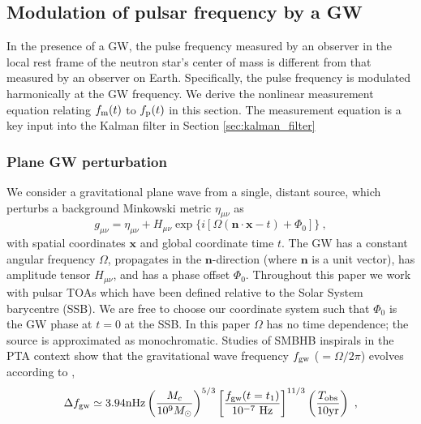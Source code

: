 \documentclass[fleqn,usenatbib,useAMS]{mnras}
\begin{document}
\subsection{Modulation of pulsar frequency by a GW} \label{sec:psr_measured}
In the presence of a GW, the pulse frequency measured by an observer in the local rest frame of the neutron star's center of mass is different from that measured by an observer on Earth. Specifically, the pulse frequency is modulated harmonically at the GW frequency. We derive the nonlinear measurement equation relating $f_{\rm m}(t)$ to $f_{\rm p}(t)$ in this section. The measurement equation is a key input into the Kalman filter in Section \eqref{sec:kalman_filter}
\subsubsection{Plane GW perturbation}\label{sec:plane_gw}
We consider a gravitational plane wave from a single, distant source, which perturbs a background Minkowski metric $\eta_{\mu \nu}$ as
\begin{equation}
	g_{\mu \nu} = \eta_{\mu \nu} + H_{\mu \nu} \exp{ \{ i[\Omega(\boldsymbol{n} \cdot \boldsymbol{x} - t) + \Phi_0] \} } \ ,
\end{equation}
with spatial coordinates $\boldsymbol{x}$ and global coordinate time $t$. The GW has a constant angular frequency $\Omega$, propagates in the $\boldsymbol{n}$-direction (where $\boldsymbol{n}$ is a unit vector), has amplitude tensor $H_{\mu \nu}$, and has a phase offset  $\Phi_0$. Throughout this paper we work with pulsar TOAs which have been defined relative to the Solar System barycentre (SSB). We are free to choose our coordinate system such that $\Phi_0$ is the GW phase at $t=0$ at the SSB. In this paper $\Omega$ has no time dependence; the source is approximated as monochromatic. Studies of SMBHB inspirals in the PTA context show that the gravitational wave frequency $f_{\rm gw}$ ($=\Omega / 2 \pi $) evolves according to \citep[e.g.][]{Zhu10},
\begin{equation}
	\Delta f_{\rm gw} \simeq 3.94 \mathrm{nHz}\left(\frac{M_c}{10^9 M_{\odot}}\right)^{5 / 3}\left[\frac{f_{\rm gw}(t=t_1)}{10^{-7} \mathrm{~Hz}}\right]^{11 / 3}\left(\frac{T_{\mathrm{obs}}}{10 \mathrm{yr}}\right) \ ,
	\label{eq:f_evolution}
\end{equation}
\end{document}
